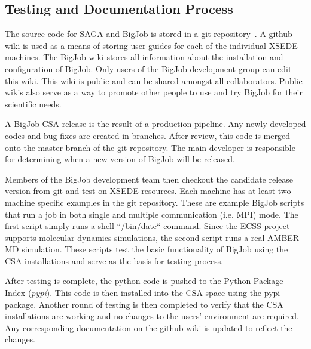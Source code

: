 \documentclass{sig-alternate}
\begin{document}
\subsection{Testing and Documentation Process}

The source code for SAGA and BigJob is stored in a git repository~. A github wiki is used as a means of storing
user guides for each of the individual XSEDE machines. The BigJob wiki stores
all information about the installation and configuration of BigJob. Only users
of the BigJob development group can edit this wiki. This wiki is public and can
be shared amongst all collaborators. Public wikis also serve as a way to promote
other people to use and try BigJob for their scientific needs.

A BigJob CSA release is the result of a production pipeline. Any newly developed
codes and bug fixes are created in branches. After review, this code is merged
onto the master branch of the git repository. The main developer is responsible
for determining when a new version of BigJob will be released. 

Members of the BigJob development team then checkout the candidate release
version from git and test on XSEDE resources. Each machine has at least two
machine specific examples in the git repository. These are example BigJob
scripts that run a job in both single and multiple communication (i.e. MPI)
mode. The first script simply runs a shell ``/bin/date`` command. Since the ECSS
project supports molecular dynamics simulations, the second script runs a real
AMBER MD simulation. These scripts test the basic functionality of BigJob using
the CSA installations and serve as the basis for testing process.

After testing is complete, the python code is pushed to the Python Package Index
(\textit{pypi}). This code is then installed into the CSA space using the pypi
package. Another round of testing is then completed to verify that the CSA
installations are working and no changes to the users' environment are required.
Any corresponding documentation on the github wiki is updated to reflect the
changes.
\end{document}
